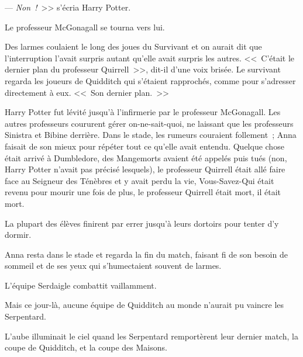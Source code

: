--- \emph{Non~!}~>> s'écria Harry Potter.

Le professeur McGonagall se tourna vers lui.

Des larmes coulaient le long des joues du Survivant et on aurait dit que l'interruption l'avait surpris autant qu'elle avait surpris les autres. <<~C'était le dernier plan du professeur Quirrell~>>, dit-il d'une voix brisée. Le survivant regarda les joueurs de Quidditch qui s'étaient rapprochés, comme pour s'adresser directement à eux. <<~Son dernier plan.~>>

Harry Potter fut lévité jusqu'à l'infirmerie par le professeur McGonagall. Les autres professeurs coururent gérer on-ne-sait-quoi, ne laissant que les professeurs Sinistra et Bibine derrière. Dans le stade, les rumeurs couraient follement~; Anna faisait de son mieux pour répéter tout ce qu'elle avait entendu. Quelque chose était arrivé à Dumbledore, des Mangemorts avaient été appelés puis tués (non, Harry Potter n'avait pas précisé lesquels), le professeur Quirrell était allé faire face au Seigneur des Ténèbres et y avait perdu la vie, Vous-Savez-Qui était revenu pour mourir une fois de plus, le professeur Quirrell était mort, il était mort.

La plupart des élèves finirent par errer jusqu'à leurs dortoirs pour tenter d'y dormir.

Anna resta dans le stade et regarda la fin du match, faisant fi de son besoin de sommeil et de ses yeux qui s'humectaient souvent de larmes.

L'équipe Serdaigle combattit vaillamment.

Mais ce jour-là, aucune équipe de Quidditch au monde n'aurait pu vaincre les Serpentard.

L'aube illuminait le ciel quand les Serpentard remportèrent leur dernier match, la coupe de Quidditch, et la coupe des Maisons. 

